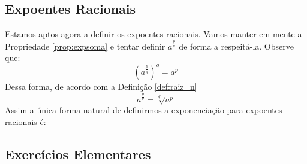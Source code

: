 \subsection{Expoentes Racionais}
Estamos aptos agora a definir os expoentes racionais. Vamos manter em mente a Propriedade \ref{prop:expsoma} e tentar definir $a^\frac{p}{q}$ de forma a respeitá-la. Observe que: $$\left(a^\frac{p}{q}\right)^q = a^p$$ Dessa forma, de acordo com a Definição \ref{def:raiz_n} $$a^\frac{p}{q} = \sqrt[q]{a^p}$$Assim a única forma natural de definirmos a exponenciação para expoentes racionais é: 
\comecaexer
\subsection*{Exercícios Elementares}

